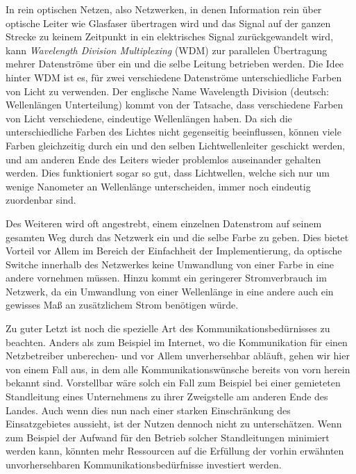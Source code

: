 In rein optischen Netzen, also Netzwerken, in denen Information rein über optische Leiter wie Glasfaser übertragen wird und das Signal auf der ganzen Strecke zu 
keinem Zeitpunkt in ein elektrisches Signal zurückgewandelt wird, kann \textit{Wavelength Division Multiplexing}
(WDM) zur parallelen Übertragung mehrer Datenströme über ein und die selbe Leitung betrieben werden. Die Idee hinter WDM ist es, für zwei verschiedene Datenströme 
unterschiedliche Farben von Licht zu verwenden. Der englische Name Wavelength Division (deutsch: Wellenlängen Unterteilung) kommt von der Tatsache, dass 
verschiedene Farben von Licht verschiedene, eindeutige Wellenlängen haben. Da sich die unterschiedliche Farben des Lichtes nicht gegenseitig beeinflussen, können
viele Farben gleichzeitig durch ein und den selben Lichtwellenleiter geschickt werden, und am anderen Ende des Leiters wieder problemlos auseinander gehalten werden.
Dies funktioniert sogar so gut, dass Lichtwellen, welche sich nur um wenige Nanometer an Wellenlänge unterscheiden, immer noch eindeutig zuordenbar sind.

Des Weiteren wird oft angestrebt, einem einzelnen Datenstrom auf seinem gesamten Weg durch das Netzwerk ein und die selbe Farbe zu geben. Dies bietet Vorteil vor
Allem im Bereich der Einfachheit der Implementierung, da optische Switche innerhalb des Netzwerkes keine Umwandlung von einer Farbe in eine andere vornehmen müssen.
Hinzu kommt ein geringerer Stromverbrauch im Netzwerk, da ein Umwandlung von einer Wellenlänge in eine andere auch ein gewisses Maß an zusätzlichem Strom benötigen
würde.

Zu guter Letzt ist noch die spezielle Art des Kommunikationsbedürnisses zu beachten. Anders als zum Beispiel im Internet, wo die Kommunikation für einen Netzbetreiber
unberechen- und vor Allem unverhersehbar abläuft, gehen wir hier von einem Fall aus, in dem alle Kommunikationswünsche bereits von vorn herein bekannt sind. Vorstellbar
wäre solch ein Fall zum Beispiel bei einer gemieteten Standleitung eines Unternehmens zu ihrer Zweigstelle am anderen Ende des Landes. Auch wenn dies nun nach einer
starken Einschränkung des Einsatzgebietes aussieht, ist der Nutzen dennoch nicht zu unterschätzen. Wenn zum Beispiel der Aufwand für den Betrieb solcher Standleitungen
minimiert werden kann, könnten mehr Ressourcen auf die Erfüllung der vorhin erwähnten unvorhersehbaren Kommunikationsbedürfnisse investiert werden.

